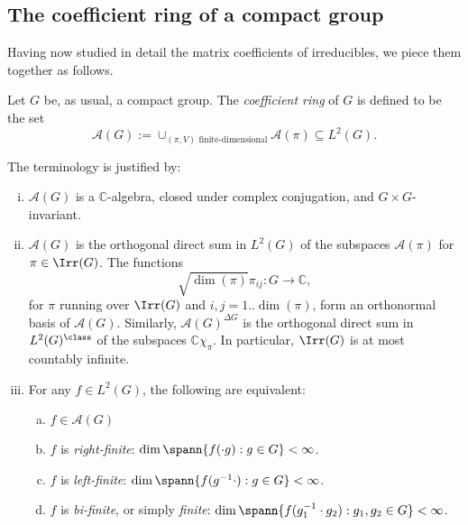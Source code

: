 \documentclass[reqno]{amsart} 
\begin{document}
\subsection{The coefficient ring of a compact group}
Having now studied in detail the matrix coefficients of irreducibles, we piece them together as follows.
\begin{definition}
  Let $G$ be, as usual, a compact group.  The \emph{coefficient ring} of $G$ is defined to be the set
  \begin{equation*}
    \mathcal{A}(G) := \cup _{(\pi,V) \text{ finite-dimensional}} \mathcal{A}(\pi) \subseteq L^2(G).
  \end{equation*}
\end{definition}
The terminology is justified by:
\begin{theorem}\label{thm:coeff-ring-characterizations}
  \begin{enumerate}
[(i)]
  \item $\mathcal{A}(G)$ is a $\mathbb{C}$-algebra, closed under complex conjugation, and $G \times G$-invariant.
  \item $\mathcal{A}(G)$ is the orthogonal direct sum in $L^2(G)$ of the subspaces $\mathcal{A}(\pi)$ for $\pi \in \Irr(G)$.  The functions
    \begin{equation}\label{eqn:ONB-via-matrix-coefs}
      \sqrt{\dim(\pi)} \pi_{i j} : G \rightarrow \mathbb{C},
    \end{equation}
    for $\pi$ running over $\Irr(G)$ and $i,j = 1..\dim(\pi)$, form an orthonormal basis of $\mathcal{A}(G)$.  Similarly, $\mathcal{A}(G)^{\Delta G}$ is the orthogonal direct sum in $L^2(G)^{\class}$ of the subspaces $\mathbb{C} \chi_\pi$.  In particular, $\Irr(G)$ is at most countably infinite.
  \item For any $f \in L^2(G)$, the following are equivalent:
    \begin{enumerate}
[(a)]
    \item $f \in \mathcal{A}(G)$
    \item $f$ is \emph{right-finite}: $\dim \spann \{f(\cdot g) : g \in G\} < \infty$.
    \item $f$ is \emph{left-finite}: $\dim \spann \{f(g^{-1} \cdot ) : g \in G\} < \infty$.
    \item $f$ is \emph{bi-finite}, or simply \emph{finite}: $\dim \spann \{f(g_1^{-1} \cdot g_2 ) : g_1, g_2 \in G\} < \infty$.
    \end{enumerate}
  \end{enumerate}
\end{theorem}
\end{document}
